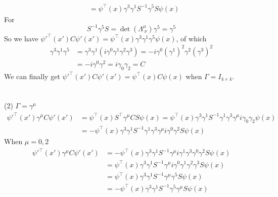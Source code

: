 \documentclass[12pt]{article}
\begin{document}
\begin{spacing}{1.5}
\begin{equation}
\begin{aligned}
&=\psi^{\top}(x)\gamma^{3}\gamma^{1}S^{-1}\gamma^{5}S\psi(x)
\end{aligned}
	\tag{1.1.3}
\end{equation}
For
\begin{equation}
S^{-1}\gamma^{5}S=\det(\Lambda^{\mu}_{\;\nu})\gamma^{5}=\gamma^{5}
	\tag{1.1.4}
\end{equation}
So we have $\psi'^{\top}(x')C\psi'(x')=\psi^{\top}(x)\gamma^{3}\gamma^{1}\gamma^{5}\psi(x)$, of which
\begin{equation}
\begin{aligned} 
\displaystyle\gamma^{3}\gamma^{1}\gamma^{5} &= \gamma^{3}\gamma^{1}(i\gamma^{0}\gamma^{1}\gamma^{2}\gamma^{3})=-i\gamma^{0}(\gamma^{1})^{2}\gamma^{2}(\gamma^{3})^{2}\\
&=-i\gamma^{0}\gamma^{2}=i\gamma_{0}\gamma_{2}=C
\end{aligned}	\tag{1.1.5}
\end{equation}
We can finally get $\psi'^{\top}(x')C\psi'(x')=\psi^{\top}(x)C\psi(x)$ when $\Gamma=I_{4\times4}$.\\
~\\
~\\
(2) $\Gamma=\gamma^{\mu}$\\
\begin{equation}
\begin{aligned}
\displaystyle \psi'^{\top}(x')\gamma^{\mu}C\psi'(x')  &= \psi^{\top}(x)S^{\top}\gamma^{\mu}CS\psi(x)=\psi^{\top}(x)\gamma^{3}\gamma^{1}S^{-1}\gamma^{1}\gamma^{3}\gamma^{\mu}i\gamma_{0}\gamma_{2}\psi(x) \\
&= -\psi^{\top}(x)\gamma^{3}\gamma^{1} S^{-1}\gamma^{1}\gamma^{3}\gamma^{\mu} i\gamma^{0}\gamma^{2} S\psi(x)
\end{aligned}	\tag{1.2.1}
\end{equation}
When $\mu=0, 2$ \\
\begin{equation}
\begin{aligned}
\displaystyle \psi'^{\top}(x')\gamma^{\mu}C\psi'(x')  &= -\psi^{\top}(x)\gamma^{3}\gamma^{1}S^{-1}\gamma^{\mu}i\gamma^{1}\gamma^{3}\gamma^{0}\gamma^{2}S\psi(x) \\
&= \psi^{\top}(x)\gamma^{3}\gamma^{1}S^{-1}\gamma^{\mu}i\gamma^{0}\gamma^{1}\gamma^{2}\gamma^{3}S\psi(x) \\
&= \psi^{\top}(x)\gamma^{3}\gamma^{1}S^{-1}\gamma^{\mu}\gamma^{5}S\psi(x) \\
&= -\psi^{\top}(x)\gamma^{3}\gamma^{1}S^{-1}\gamma^{5}\gamma^{\mu}S\psi(x) \\

\end{aligned}
\end{equation}
\end{spacing}
\end{document}

